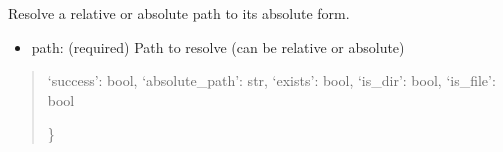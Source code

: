 \documentclass[a4paper,11pt,english,openany,oneside]{sphinxmanual}
\begin{document}
\begin{fulllineitems}
\label{\detokenize{modules/api:app.api.resolve_path}}
\pysigstartsignatures
\pysiglinewithargsret
{}
{}
{}
\pysigstopsignatures
\sphinxAtStartPar
Resolve a relative or absolute path to its absolute form.
\begin{description}
\begin{itemize}
\item {} 
\sphinxAtStartPar
path: (required) Path to resolve (can be relative or absolute)

\end{itemize}

\end{description}
\begin{quote}\begin{description}
\sphinxAtStartPar
\begin{description}
\sphinxlineitem{\{}
\sphinxAtStartPar
‘success’: bool,
‘absolute\_path’: str,
‘exists’: bool,
‘is\_dir’: bool,
‘is\_file’: bool

\end{description}

\sphinxAtStartPar
\}


\end{description}\end{quote}

\end{fulllineitems}

\end{document}
